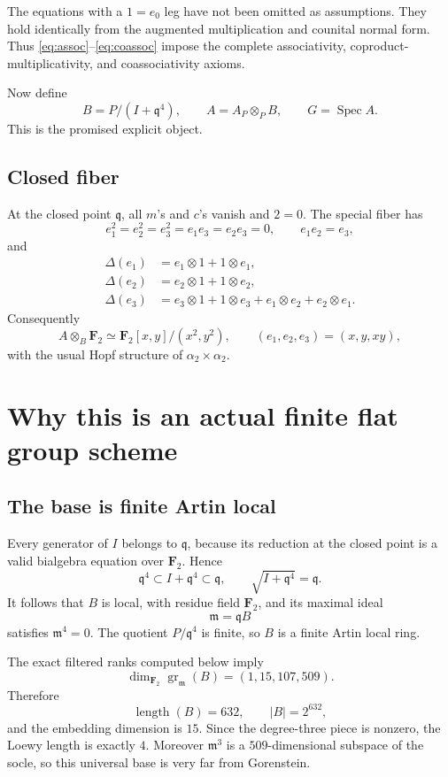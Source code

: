 \documentclass[11pt]{article}
\theoremstyle{remark}
\newcommand{\F}{\mathbf F}
\newcommand{\Spec}{\operatorname{Spec}}
\newcommand{\gr}{\operatorname{gr}}
\newcommand{\length}{\operatorname{length}}
\newcommand{\q}{\mathfrak q}
\newcommand{\m}{\mathfrak m}
\begin{document}
The equations with a \(1=e_0\) leg have not been omitted as assumptions.
They hold identically from the augmented multiplication and counital normal
form.  Thus \eqref{eq:assoc}--\eqref{eq:coassoc} impose the complete
associativity, coproduct-multiplicativity, and coassociativity axioms.

Now define
\begin{equation}\label{eq:B-definition}
  B=P/(I+\q^4),\qquad A=A_P\otimes_P B,
  \qquad G=\Spec A.
\end{equation}
This is the promised explicit object.

\subsection{Closed fiber}

At the closed point \(\q\), all \(m\)'s and \(c\)'s vanish and \(2=0\).  The
special fiber has
\[
  e_1^2=e_2^2=e_3^2=e_1e_3=e_2e_3=0,
  \qquad e_1e_2=e_3,
\]
and
\[
\begin{aligned}
 \Delta(e_1)&=e_1\otimes1+1\otimes e_1,\\
 \Delta(e_2)&=e_2\otimes1+1\otimes e_2,\\
 \Delta(e_3)&=e_3\otimes1+1\otimes e_3
              +e_1\otimes e_2+e_2\otimes e_1.
\end{aligned}
\]
Consequently
\[
  A\otimes_B\F_2\simeq\F_2[x,y]/(x^2,y^2),
  \qquad(e_1,e_2,e_3)=(x,y,xy),
\]
with the usual Hopf structure of \(\alpha_2\times\alpha_2\).

\section{Why this is an actual finite flat group scheme}

\subsection{The base is finite Artin local}

Every generator of \(I\) belongs to \(\q\), because its reduction at the
closed point is a valid bialgebra equation over \(\F_2\).  Hence
\[
  \q^4\subset I+\q^4\subset\q,
  \qquad \sqrt{I+\q^4}=\q.
\]
It follows that \(B\) is local, with residue field \(\F_2\), and its maximal
ideal
\[
  \m=\q B
\]
satisfies \(\m^4=0\).  The quotient \(P/\q^4\) is finite, so \(B\) is a
finite Artin local ring.

The exact filtered ranks computed below imply
\begin{equation}\label{eq:hilbert}
 \dim_{\F_2}\gr_{\m}(B)=(1,15,107,509).
\end{equation}
Therefore
\[
 \length(B)=632,\qquad |B|=2^{632},
\]
and the embedding dimension is \(15\).  Since the degree-three piece is
nonzero, the Loewy length is exactly \(4\).  Moreover \(\m^3\) is a
\(509\)-dimensional subspace of the socle, so this universal base is very far
from Gorenstein.
\end{document}
